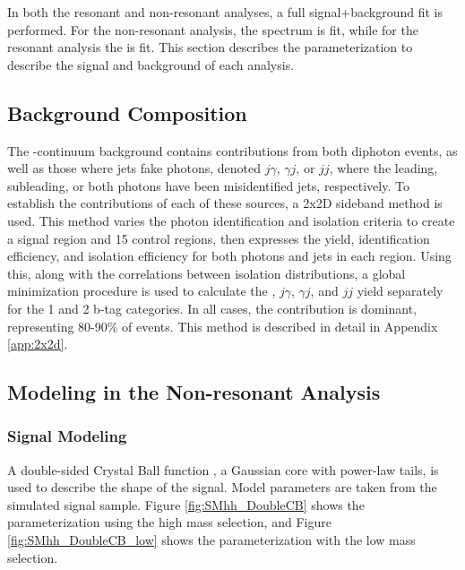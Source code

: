 In both the resonant and non-resonant analyses, a full signal+background fit is performed. For the non-resonant analysis, the \myy spectrum is fit, while for the resonant analysis the \myybb is fit. This section describes the parameterization to describe the signal and background of each analysis.

\subsection{Background Composition}

The \yy-continuum background contains contributions from both diphoton events, as well as those where jets fake photons, denoted $j\gamma$, $\gamma j$, or $jj$, where the leading, subleading, or both photons have been misidentified jets, respectively. To establish the contributions of each of these sources, a 2x2D sideband method \cite{2x2d-sideband} is used. This method varies the photon identification and isolation criteria to create a signal region and 15 control regions, then expresses the yield, identification efficiency, and isolation efficiency for both photons and jets in each region. Using this, along with the correlations between isolation distributions, a global minimization procedure is used to calculate the \yy, $j\gamma$, $\gamma j$, and $jj$ yield separately for the 1 and 2 b-tag categories. In all cases, the \yy contribution is dominant, representing 80-90\% of events. This method is described in detail in Appendix \ref{app:2x2d}. 




\subsection{Modeling in the Non-resonant Analysis}
\subsubsection{Signal Modeling}

A double-sided Crystal Ball function \cite{dscb-diphoton}, a Gaussian core with power-law tails, is used to describe the shape of the \hhyybb signal. Model parameters are taken from the simulated signal sample. Figure \ref{fig:SMhh_DoubleCB} shows the parameterization using the high mass selection, and Figure \ref{fig:SMhh_DoubleCB_low} shows the parameterization with the low mass selection.

